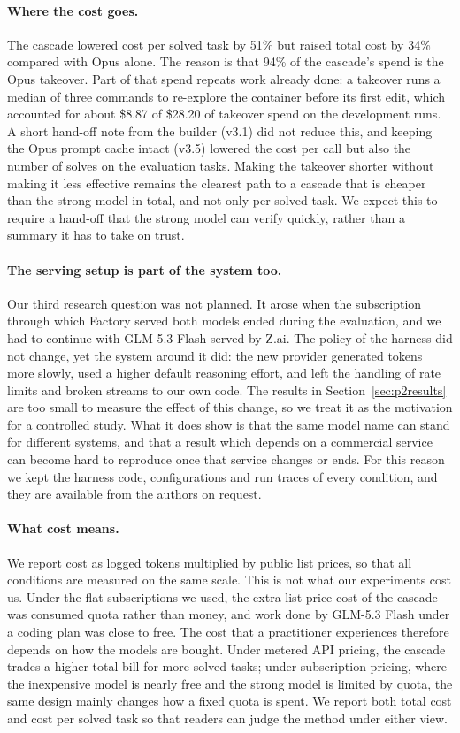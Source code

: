\paragraph{Where the cost goes.}
The cascade lowered cost per solved task by 51\% but raised total cost by 34\% compared with Opus alone. The
reason is that 94\% of the cascade's spend is the Opus takeover. Part of that spend repeats work already done:
a takeover runs a median of three commands to re-explore the container before its first edit, which accounted
for about \$8.87 of \$28.20 of takeover spend on the development runs. A short hand-off note from the builder
(v3.1) did not reduce this, and keeping the Opus prompt cache intact (v3.5) lowered the cost per call but also
the number of solves on the evaluation tasks. Making the takeover shorter without making it less effective remains the clearest path to
a cascade that is cheaper than the strong model in total, and not only per solved task. We expect this to
require a hand-off that the strong model can verify quickly, rather than a summary it has to take on trust.

\paragraph{The serving setup is part of the system too.}
Our third research question was not planned. It arose when the subscription through which Factory served both
models ended during the evaluation, and we had to continue with GLM-5.3 Flash served by Z.ai. The policy of the harness did not change, yet the system around it did: the new provider generated
tokens more slowly, used a higher default reasoning effort, and left the handling of rate limits and broken
streams to our own code. The results in Section~\ref{sec:p2results} are too small to measure the effect of this
change, so we treat it as the motivation for a controlled study. What it does show is that the same model name
can stand for different systems, and that a result which depends on a commercial service can become hard to
reproduce once that service changes or ends. For this reason we kept the harness code, configurations and run
traces of every condition, and they are available from the authors on request.

\paragraph{What cost means.}
We report cost as logged tokens multiplied by public list prices, so that all conditions are measured on the same
scale. This is not what our experiments cost us. Under the flat subscriptions we used, the extra list-price cost
of the cascade was consumed quota rather than money, and work done by GLM-5.3 Flash under a coding plan was close
to free. The cost that a practitioner experiences therefore depends on how the models are bought. Under metered
API pricing, the cascade trades a higher total bill for more solved tasks; under subscription pricing, where the
inexpensive model is nearly free and the strong model is limited by quota, the same design mainly changes how a
fixed quota is spent. We report both total cost and cost per solved task so that readers can judge the method
under either view.
